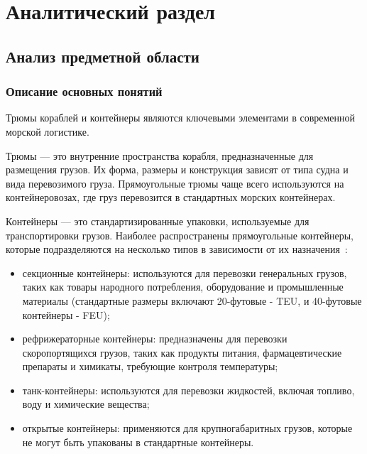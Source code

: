 \chapter{Аналитический раздел}

\section{Анализ предметной области}

\subsection{Описание основных понятий}

Трюмы кораблей и контейнеры являются ключевыми элементами в современной морской логистике. 

Трюмы — это внутренние пространства корабля, предназначенные для размещения грузов. Их форма, размеры и конструкция зависят от типа судна и вида перевозимого груза. Прямоугольные трюмы чаще всего используются на контейнеровозах, где груз перевозится в стандартных морских контейнерах.

Контейнеры — это стандартизированные упаковки, используемые для транспортировки грузов. Наиболее распространены прямоугольные контейнеры, которые подразделяются на несколько типов в зависимости от их назначения~\cite{container_types}:

\begin{itemize}
	\item секционные контейнеры: используются для перевозки генеральных грузов, таких как товары народного потребления, оборудование и промышленные материалы (стандартные размеры включают 20-футовые - TEU, и 40-футовые контейнеры - FEU);
	\item рефрижераторные контейнеры: предназначены для перевозки скоропортящихся грузов, таких как продукты питания, фармацевтические препараты и химикаты, требующие контроля температуры;
	\item танк-контейнеры: используются для перевозки жидкостей, включая топливо, воду и химические вещества;
	\item открытые контейнеры: применяются для крупногабаритных грузов, которые не могут быть упакованы в стандартные контейнеры.
\end{itemize}

